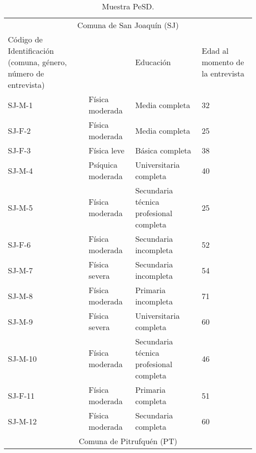 \begin{table}[!htpb]
\centering
\small
\begin{threeparttable}
\caption{Muestra PeSD.}\label{tab01}
\begin{tabular}{l>{\raggedright}p{}>{\raggedright}p{}l}
\toprule
\multicolumn{4}{c}{Comuna de San Joaquín (SJ)}\\
\multicolumn{1}{p{0.2\textwidth}}{Código de Identificación (comuna, género, número de entrevista)} &
\multicolumn{1}{p{0.2\textwidth}}{Situación de Discapacidad} &
Educación & 
\multicolumn{1}{p{0.2\textwidth}}{Edad al momento de la entrevista} \\
\midrule
SJ-M-1 & Física moderada & Media completa & 32 \\
SJ-F-2 & Física moderada & Media completa & 25 \\
SJ-F-3 & Física leve & Básica completa & 38 \\
SJ-M-4 & Psíquica moderada & Universitaria completa & 40 \\
SJ-M-5 & Física moderada & Secundaria técnica profesional completa &
25 \\
SJ-F-6 & Física moderada & Secundaria incompleta & 52 \\
SJ-M-7 & Física severa & Secundaria incompleta & 54 \\
SJ-M-8 & Física moderada & Primaria incompleta & 71 \\
SJ-M-9 & Física severa & Universitaria completa & 60 \\
SJ-M-10 & Física moderada & Secundaria técnica profesional completa &
46 \\
SJ-F-11 & Física moderada & Primaria completa & 51 \\
SJ-M-12 & Física moderada & Secundaria completa & 60 \\

\midrule
\multicolumn{4}{c}{Comuna de Pitrufquén (PT)} \\
 

\end{tabular}
\end{threeparttable}
\end{table}
